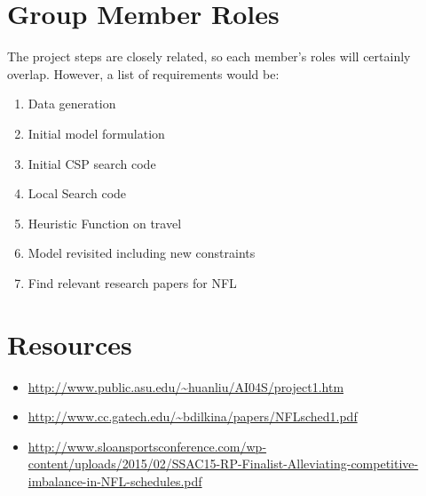 \documentclass{article}
\begin{document}
	\section{Group Member Roles}
	The project steps are closely related, so each member's roles will certainly overlap. However, a list of requirements would be:

	\begin{enumerate}
		\item Data generation
		\item Initial model formulation
		\item Initial CSP search code
		\item Local Search code
		\item Heuristic Function on travel
		\item Model revisited including new constraints
		\item Find relevant research papers for NFL
	\end{enumerate}

	\section{Resources}
	\begin{itemize}
		\item \url{http://www.public.asu.edu/~huanliu/AI04S/project1.htm}
		\item \url{http://www.cc.gatech.edu/~bdilkina/papers/NFLsched1.pdf}
		\item \url{http://www.sloansportsconference.com/wp-content/uploads/2015/02/SSAC15-RP-Finalist-Alleviating-competitive-imbalance-in-NFL-schedules.pdf}
	\end{itemize}
	
\end{document}
